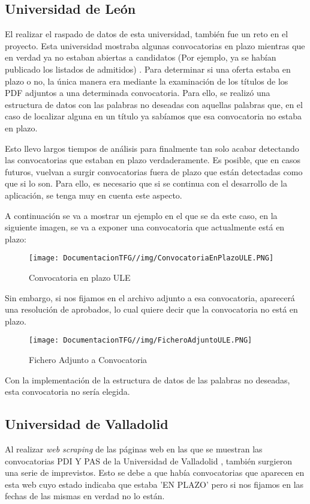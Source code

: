 \subsection{Universidad de León}
El realizar el raspado de datos de esta universidad, también fue un reto en el proyecto. Esta universidad mostraba algunas convocatorias en plazo mientras que en verdad ya no estaban abiertas a candidatos (Por ejemplo, ya se habían publicado los listados de admitidos) \cite{ule:latex}. Para determinar si una oferta estaba en plazo o no, la única manera era mediante la examinación de los títulos de los PDF adjuntos a una determinada convocatoria. Para ello, se realizó una estructura de datos con las palabras no deseadas con aquellas palabras que, en el caso de localizar alguna en un título ya sabíamos que esa convocatoria no estaba en plazo. 

Esto llevo largos tiempos de análisis para finalmente tan solo acabar detectando las convocatorias que estaban en plazo verdaderamente. Es posible, que en casos futuros, vuelvan a surgir convocatorias fuera de plazo que están detectadas como que si lo son. Para ello, es necesario que si se continua con el desarrollo de la aplicación, se tenga muy en cuenta este aspecto.

A continuación se va a mostrar un ejemplo en el que se da este caso, en la siguiente imagen, se va a exponer una convocatoria que actualmente está en plazo:

\begin{figure}[H]
    \centering
    \texttt{[image: DocumentacionTFG//img/ConvocatoriaEnPlazoULE.PNG]}
    \caption{Convocatoria en plazo ULE}
    \label{fig:enter-label}
\end{figure}

Sin embargo, si nos fijamos en el archivo adjunto a esa convocatoria, aparecerá una resolución de aprobados, lo cual quiere decir que la convocatoria no está en plazo.

\begin{figure}[H]
    \centering
    \texttt{[image: DocumentacionTFG//img/FicheroAdjuntoULE.PNG]}
    \caption{Fichero Adjunto a Convocatoria}
    \label{fig:enter-label}
\end{figure}

Con la implementación de la estructura de datos de las palabras no deseadas, esta convocatoria no sería elegida.

\subsection{Universidad de Valladolid}
Al realizar \textit{web scraping} de las páginas web en las que se muestran las convocatorias PDI Y PAS de la Universidad de Valladolid \cite{uva:latex}, también surgieron una serie de imprevistos. Esto se debe a que había convocatorias que aparecen en esta web cuyo estado indicaba que estaba 'EN PLAZO' pero si nos fijamos en las fechas de las mismas en verdad no lo están.

